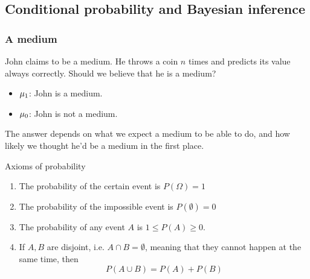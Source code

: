 \subsection{Conditional probability and Bayesian inference}
\begin{frame}
  \frametitle{A medium}
  \begin{example}
    John claims to be a medium. He throws a coin $n$ times and predicts its value always correctly. Should we believe that he is a medium?
  \end{example}
  \begin{itemize}
  \item $\mu_1$: John is a medium.
  \item $\mu_0$: John is not a medium.
  \end{itemize}
  The answer depends on what we \alert{expect} a medium to be able to do, and how likely we thought he'd be a medium in the first place.
\end{frame}
\begin{frame}
  \begin{block}{Axioms of probability}
    \begin{enumerate}
    \item The probability of the certain event is $P(\Omega) = 1$
    \item The probability of the impossible event is
      $P(\emptyset) = 0$
    \item The probability of any event $A$ is $1 \leq P(A) \geq 0$.
    \item If $A, B$ are disjoint, i.e. $A \cap B = \emptyset$, meaning
      that they cannot happen at the same time, then
      \[
      P(A \cup B) = P(A) + P(B)
      \]
    \end{enumerate}
  \end{block}
\end{frame}

